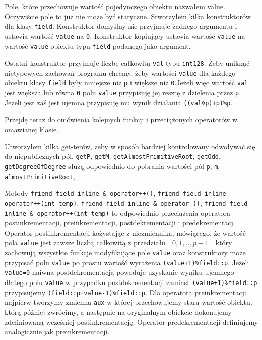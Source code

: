\documentclass{article}
\begin{document}
Pole, które przechowuje wartość pojedynczego obiektu nazwałem value. Oczywiście
pole to już nie może być statyczne.
Stworzyłem kilka konstruktorów dla klasy \texttt{field}. Konstruktor domyślny
nie przyjmuje żadnego argumentu i ustawia wartość \texttt{value} na \texttt{0}.
Konstruktor kopiujący ustawia wartość \texttt{value} na wartość \texttt{value} obiektu 
typu \texttt{field} podanego jako argument. 

Ostatni konstruktor przyjmuje liczbę całkowitą \texttt{val} 
typu \texttt{\textunderscore \textunderscore int128}. Żeby uniknąć nietypowych zachowań programu chcemy, żeby wartości \texttt{value} dla 
każdego obiektu klasy \texttt{field} były mniejsze niż \texttt{p} i większe niż \texttt{0}.Jeżeli więc wartość \texttt{val}
jest większa lub równa \texttt{0}  polu \texttt{value} przypisuję
jej resztę z dzielenia przez \texttt{p}. Jeżeli jest zaś jest ujemna przypisuję mu wynik działania \texttt{((val\%p)+p)\%p}.


Przejdę teraz do omówienia kolejnych funkcji i przeciążonych operatorów
w omawianej klasie.

Utworzyłem kilka get-terów, żeby w sposób bardziej kontrolowany odwoływać się do niepublicznych pól. 
\texttt{getP}, \texttt{getM}, \texttt{getAlmostPrimitiveRoot}, \texttt{getOdd}, \texttt{getDegreeOfDegree}
służą odpowiednio do pobrania wartości pól \texttt{p}, \texttt{m}, \texttt{almostPrimitiveRoot},

Metody \texttt{friend field inline \& operator++()}, 
\texttt{friend field inline operator++(int temp)},
\texttt{friend field inline \& operator--()},
\texttt{friend field inline \& operator++(int temp)} to odpowiednio przeciążenia
operatora postinkrementacji, preinkrementacji, postdekrementacji i predekrementacj.
Operator postinkrementacji kożystając z niezmiennika, mówiącego,
że wartość pola \texttt{value} jest zawsze liczbą całkowitą z
przedziału $[0,1,..,p-1]$ który
zachowują wszystkie funkcje modyfikujące pole \texttt{value} oraz konstruktory
może przypisać polu \texttt{value} po prostu wartość wyrażenia
\texttt{(value+1)\%field::p}. Jeżeli \texttt{value=0} naiwna postdekrementacja
powoduje uzyskanie wyniku ujemnego dlatego polu \texttt{value} w przypadku postdekrementacji
zamiast \texttt{(value+1)\%field::p} przypisujemy 
\texttt{(field::p+value-1)\%field::p}. Dla operatora 
preinkrementacji najpierw tworzymy zmienną \texttt{aux} w której przechowujemy
starą wartość obiektu, którą później zwrócimy, a następnie na oryginalnym 
obiekcie dokonujemy zdefiniowaną wcześniej postinkrementację.
Operator predekrementacji definiujemy analogicznie jak preinkrementacji.
\end{document}
